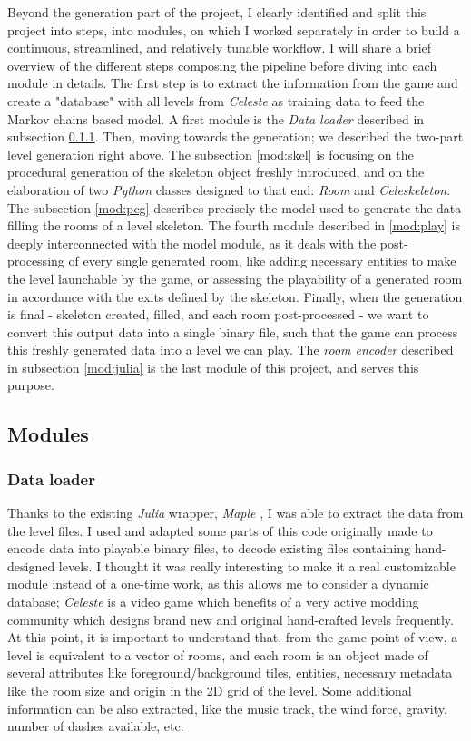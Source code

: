 \documentclass{article}
\newcommand{\Celeste}{\textit{Celeste} }
\begin{document}
\noindent Beyond the generation part of the project, I clearly identified and split this project into steps, into modules, on which I worked separately in order to build a continuous, streamlined, and relatively tunable workflow. I will share a brief overview of the different steps composing the pipeline before diving into each module in details. The first step is to extract the information from the game and create a "database" with all levels from \Celeste as training data to feed the Markov chains based model. A first module is the \textit{Data loader} described in subsection \ref{mod:data}. Then, moving towards the generation; we described the two-part level generation right above. The subsection \ref{mod:skel} is focusing on the procedural generation of the skeleton object freshly introduced, and on the elaboration of two \textit{Python} classes designed to that end: \textit{Room} and \textit{Celeskeleton}. The subsection \ref{mod:pcg} describes precisely the model used to generate the data filling the rooms of a level skeleton. The fourth module described in \ref{mod:play} is deeply interconnected with the model module, as it deals with the post-processing of every single generated room, like adding necessary entities to make the level launchable by the game, or assessing the playability of a generated room in accordance with the exits defined by the skeleton. Finally, when the generation is final - skeleton created, filled, and each room post-processed - we want to convert this output data into a single binary file, such that the game can process this freshly generated data into a level we can play. The \textit{room encoder} described in subsection \ref{mod:julia} is the last module of this project, and serves this purpose.
 
\subsection{Modules}
\subsubsection{Data loader} \label{mod:data}
Thanks to the existing \textit{Julia} wrapper, \textit{Maple} \cite{maple}, I was able to extract the data from the level files. I used and adapted some parts of this code originally made to encode data into playable binary files, to decode existing files containing hand-designed levels. I thought it was really interesting to make it a real customizable module instead of a one-time work, as this allows me to consider a dynamic database; \Celeste is a video game which benefits of a very active modding community which designs brand new and original hand-crafted levels frequently. At this point, it is important to understand that, from the game point of view, a level is equivalent to a vector of rooms, and each room is an object made of several attributes like foreground/background tiles, entities, necessary metadata like the room size and origin in the 2D grid of the level. Some additional information can be also extracted, like the music track, the wind force, gravity, number of dashes available, etc.
\end{document}
